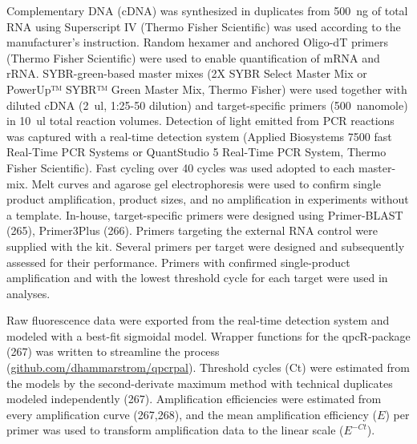 \documentclass[twoside,10pt]{gihclass} %
\begin{document}
Complementary DNA (cDNA) was synthesized in duplicates from \SI{500}{ng} of total RNA using Superscript IV (Thermo Fisher Scientific) was used according to the manufacturer's instruction. Random hexamer and anchored Oligo-dT primers (Thermo Fisher Scientific) were used to enable quantification of mRNA and rRNA.
SYBR-green-based master mixes (2X SYBR Select Master Mix or PowerUp™ SYBR™ Green Master Mix, Thermo Fisher) were used together with diluted cDNA (\SI{2}{ul}, 1:25-50 dilution) and target-specific primers (\SI{500}{nanomole}) in \SI{10}{ul} total reaction volumes. Detection of light emitted from PCR reactions was captured with a real-time detection system (Applied Biosystems 7500 fast Real-Time PCR Systems or QuantStudio 5 Real-Time PCR System, Thermo Fisher Scientific). Fast cycling over 40 cycles was used adopted to each master-mix. Melt curves and agarose gel electrophoresis were used to confirm single product amplification, product sizes, and no amplification in experiments without a template.
In-house, target-specific primers were designed using Primer-BLAST (265), Primer3Plus (266). Primers targeting the external RNA control were supplied with the kit. Several primers per target were designed and subsequently assessed for their performance. Primers with confirmed single-product amplification and with the lowest threshold cycle for each target were used in analyses.

Raw fluorescence data were exported from the real-time detection system and modeled with a best-fit sigmoidal model.
Wrapper functions for the qpcR-package (267) was written to streamline the process
(\href{http://www.github.com/dhammarstrom/qpcrpal}{github.com/dhammarstrom/qpcrpal}).
Threshold cycles (Ct) were estimated from the models by the second-derivate maximum method with technical duplicates modeled independently (267).
Amplification efficiencies were estimated from every amplification curve
(267,268),
and the mean amplification efficiency (\(E\)) per primer was used to transform amplification data to the linear scale (\(E^{-Ct}\)).
\end{document}
